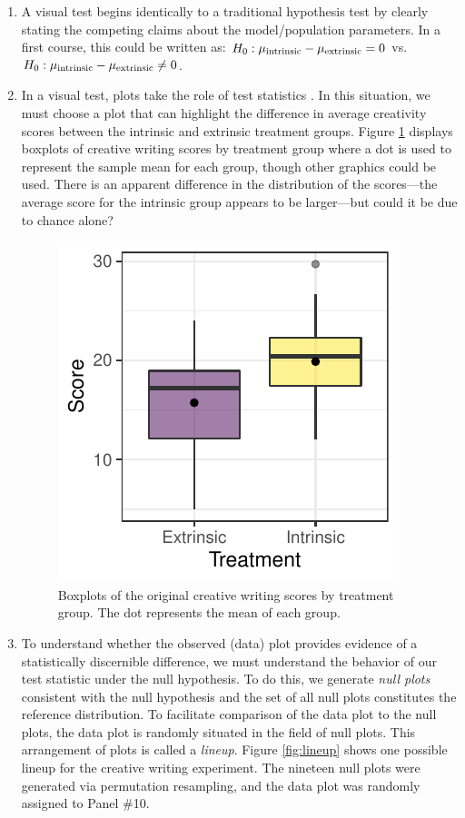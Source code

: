 \documentclass[12pt]{article}
\begin{document}
\begin{enumerate}
\def\labelenumi{\arabic{enumi}.}
\item
  A visual test begins identically to a traditional hypothesis test by
  clearly stating the competing claims about the model/population
  parameters. In a first course, this could be written as:
  \(H_0: \mu_{\rm intrinsic} - \mu_{\rm extrinsic} = 0\)
  vs.~\(H_0: \mu_{\rm intrinsic} - \mu_{\rm extrinsic} \ne 0\).
\item
  In a visual test, plots take the role of test statistics
  \citep{Buja-2009bd}. In this situation, we must choose a plot that can
  highlight the difference in average creativity scores between the
  intrinsic and extrinsic treatment groups. Figure \ref{fig:data_plot}
  displays boxplots of creative writing scores by treatment group where
  a dot is used to represent the sample mean for each group, though
  other graphics could be used. There is an apparent difference in the
  distribution of the scores---the average score for the intrinsic group
  appears to be larger---but could it be due to chance alone?

  \begin{figure}
  \centering
  \includegraphics{figs/diff_means_plot.pdf}
  \caption{\label{fig:data_plot} Boxplots of the original creative
  writing scores by treatment group. The dot represents the mean of each
  group.}
  \end{figure}
\item
  To understand whether the observed (data) plot provides evidence of a
  statistically discernible difference, we must understand the behavior
  of our test statistic under the null hypothesis. To do this, we
  generate \emph{null plots} consistent with the null hypothesis and the
  set of all null plots constitutes the reference distribution. To
  facilitate comparison of the data plot to the null plots, the data
  plot is randomly situated in the field of null plots. This arrangement
  of plots is called a \emph{lineup}. Figure \ref{fig:lineup} shows one
  possible lineup for the creative writing experiment. The nineteen null
  plots were generated via permutation resampling, and the data plot was
  randomly assigned to Panel \#10.


\end{enumerate}
\end{document}
